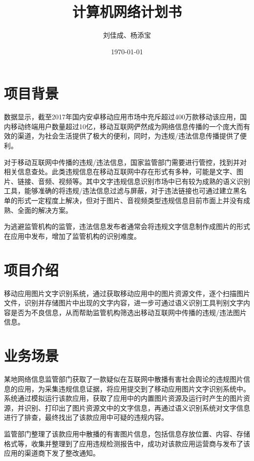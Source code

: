 \documentclass[UTF8]{ctexart}
\title{计算机网络计划书}
\author{刘佳成、杨添宝}
\date{\today}
\begin{document}
	
	\maketitle
	
	\section{项目背景}
		\par 数据显示，截至2017年国内安卓移动应用市场中充斥超过400万款移动该应用，国内移动终端用户数量超过10亿，移动互联网俨然成为网络信息传播的一个庞大而有效的渠道，为社会生活提供了极大的便利，同时，为违规/违法信息传播提供了便利。
		\par 对于移动互联网中传播的违规/违法信息，国家监管部门需要进行管控，找到并对相关信息查处。此类违规信息在移动互联网中存在形式有多种，可能是文字、图片、链接、音频、视频等。其中文字违规信息识别市场中已有较为成熟的语义识别工具，能够准确的将违规/违法信息过滤与屏蔽，对于违法链接也可通过建立黑名单的形式一定程度上解决，但对于图片、音视频类型违规信息目前市面上并没有成熟、全面的解决方案。
		\par 为逃避监管机构的监管，违法信息发布者通常会将违规文字信息制作成图片的形式在应用中发布，增加了监管机构的识别难度。
		
	\section{项目介绍}
		\par 移动应用图片文字识别系统，通过获取移动应用中的图片资源文件，逐个扫描图片文件，识别并存储图片中出现的文字内容，进一步可通过语义识别工具判别文字内容是否为不良信息，从而帮助监管机构筛选出移动互联网中传播的违规/违法图片信息。
	
	\section{业务场景}
		\par 某地网络信息监管部门获取了一款疑似在互联网中散播有害社会舆论的违规图片信息的应用，为采集违规信息证据，将应用提交到了移动应用图片文字识别系统中。系统通过模拟运行该款应用，获取了应用中的内置图片资源及运行时产生的图片资源，并识别、打印出了图片资源文中的文字信息，再通过语义识别系统对文字信息进行了排查，最终找出了该款应用中可疑的违规内容。
		\par 监管部门整理了该款应用中散播的有害图片信息，包括信息存放位置、内容、存储格式等，收集并整理到了应用违规检测报告中，成功对该款应用运营商与发布了该应用的渠道商下发了整改通知。
		
\end{document}
